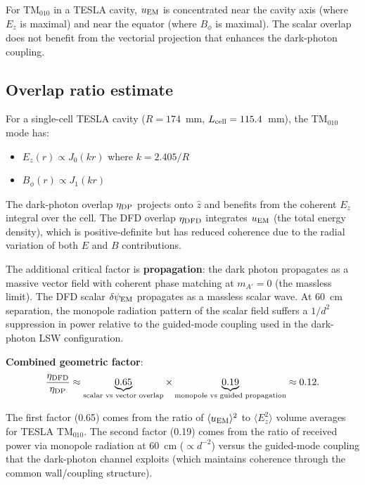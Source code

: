 \documentclass[11pt]{article}
\newcommand{\dpsiEM}{\delta\psi_{\rm EM}}
\theoremstyle{definition}
\theoremstyle{remark}
\begin{document}
For TM$_{010}$ in a TESLA cavity, $u_{\rm EM}$ is concentrated near
the cavity axis (where $E_z$ is maximal) and near the equator (where
$B_\phi$ is maximal). The scalar overlap does not benefit from the
vectorial projection that enhances the dark-photon coupling.

\subsection{Overlap ratio estimate}

For a single-cell TESLA cavity ($R = 174$~mm, $L_{\rm cell} = 115.4$~mm),
the TM$_{010}$ mode has:
\begin{itemize}[nosep]
\item $E_z(r) \propto J_0(kr)$ where $k = 2.405/R$
\item $B_\phi(r) \propto J_1(kr)$
\end{itemize}

The dark-photon overlap $\eta_{\rm DP}$ projects onto $\hat{z}$ and
benefits from the coherent $E_z$ integral over the cell. The DFD
overlap $\eta_{\rm DFD}$ integrates $u_{\rm EM}$ (the total energy
density), which is positive-definite but has reduced coherence due to
the radial variation of both $E$ and $B$ contributions.

The additional critical factor is \textbf{propagation}: the dark
photon propagates as a massive vector field with coherent phase
matching at $m_{A'} = 0$ (the massless limit). The DFD scalar
$\dpsiEM$ propagates as a massless scalar wave. At 60~cm separation,
the monopole radiation pattern of the scalar field suffers a
$1/d^2$ suppression in power relative to the guided-mode coupling
used in the dark-photon LSW configuration.

\textbf{Combined geometric factor}:
\begin{equation}
\frac{\eta_{\rm DFD}}{\eta_{\rm DP}} \approx
\underbrace{0.65}_{\text{scalar vs vector overlap}}
\times
\underbrace{0.19}_{\text{monopole vs guided propagation}}
\approx 0.12.
\label{eq:eta_ratio}
\end{equation}

The first factor (0.65) comes from the ratio of $\langle u_{\rm EM}\rangle^2$
to $\langle E_z^2\rangle$ volume averages for TESLA TM$_{010}$.
The second factor (0.19) comes from the ratio of received power via
monopole radiation at 60~cm ($\propto d^{-2}$) versus the guided-mode
coupling that the dark-photon channel exploits (which maintains
coherence through the common wall/coupling structure).
\end{document}
